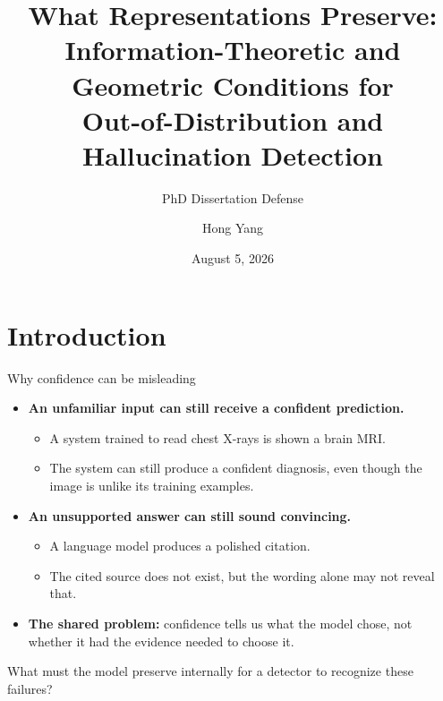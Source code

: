 \documentclass[aspectratio=1610]{beamer}
\title[What Representations Preserve]{What Representations Preserve:\\Information-Theoretic and Geometric Conditions for\\Out-of-Distribution and Hallucination Detection}
\subtitle{PhD Dissertation Defense}
\author{Hong Yang}
\institute{Rochester Institute of Technology}
\date{August 5, 2026}
\begin{document}

\begin{frame}
  \titlepage
\end{frame}

\section{Introduction}

\begin{frame}{Why confidence can be misleading}
\begin{itemize}
  \item \textbf{An unfamiliar input can still receive a confident prediction.}
  \begin{itemize}
    \item A system trained to read chest X-rays is shown a brain MRI.
    \item The system can still produce a confident diagnosis, even though the image is unlike its training examples.
  \end{itemize}
  \item \textbf{An unsupported answer can still sound convincing.}
  \begin{itemize}
    \item A language model produces a polished citation.
    \item The cited source does not exist, but the wording alone may not reveal that.
  \end{itemize}
  \item \textbf{The shared problem:} confidence tells us what the model chose, not whether it had the evidence needed to choose it.
\end{itemize}

\vfill
\begin{center}
  \large What must the model preserve internally for a detector to recognize these failures?
\end{center}
\end{frame}
\end{document}
